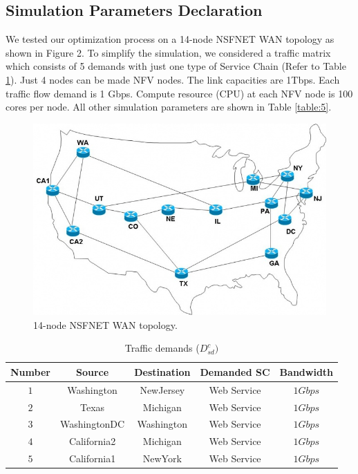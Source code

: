 \documentclass[12pt]{article}
\begin{document}
\subsection{Simulation Parameters Declaration}
We tested our optimization process on a 14-node NSFNET WAN topology as shown in Figure 2. To simplify the simulation, we considered a traffic matrix which consists of 5 demands with just one type of Service Chain (Refer to Table \ref{table:4}). Just 4  nodes can be made NFV nodes. The link capacities are 1Tbps. Each traffic flow demand is 1 Gbps. Compute resource (CPU) at each NFV node is 100 cores per node. All other simulation parameters are shown in Table \ref{table:5}.
\begin{figure}[t!]
\includegraphics[scale=0.5]{nsfnet.jpg}
\caption{14-node NSFNET WAN topology.}
\end{figure}
\begin{table}[t!]
\centering
\begin{tabular}{|c c c c c|} 
 \hline
 Number&Source & Destination & Demanded SC&  Bandwidth \\ [0.5ex] 
 \hline
$1$&Washington & NewJersey & Web Service& $1Gbps$\\ 
$2$&Texas & Michigan & Web Service& $1Gbps$\\
$3$&WashingtonDC & Washington & Web Service& $1Gbps$\\
$4$&California2 & Michigan & Web Service& $1Gbps$\\
$5$&California1 & NewYork & Web Service& $1Gbps$\\[1ex] 
 \hline
\end{tabular}
\caption{Traffic demands ($D_{sd}^{c})$}
\label{table:4}
\end{table}
\end{document}
